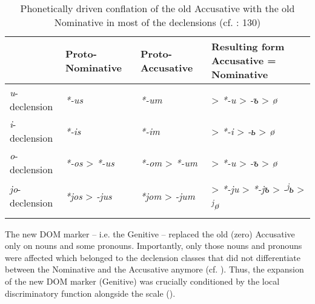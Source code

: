 \documentclass[output=paper]{langsci/langscibook}
\begin{document}
\begin{table}
\begin{tabularx}{\textwidth}{lp{2.3cm}p{2.3cm}Q}
\lsptoprule
\bfseries ~ & \bfseries Proto- Nominative & \bfseries Proto- Accusative & {\bfseries Resulting form}
\bfseries Accusative = Nominative\\
\midrule
\textit{u}{}-declension & \textit{*-us} & \textit{*-um} & > \textit{*-u} > \textit{-{ъ}} > \textit{ø}\\
\textit{i}{}-declension & \textit{*-is} & \textit{*-im} & > \textit{*-i} > \textit{-{ь}} > \textit{ø}\\
\textit{o}{}-declension & \textit{*-os} > \textit{*-us} & \textit{*-om} > \textit{*-um} & > \textit{*-u} > \textit{-{ъ}} > \textit{ø}\\
\textit{jo}{}-declension & \textit{*jos} > \textit{-jus} & \textit{*jom} > \textit{-jum} & > \textit{*-ju} > \textit{*}\textit{{}-j}\textit{{ъ} }> \textit{-\textsuperscript{j}}\textit{{ь}} > \textit{\textsuperscript{j}}\textit{ø}\\
\lspbottomrule
\end{tabularx}

\caption{Phonetically driven conflation of the old Accusative with the old Nominative in most of the declensions (cf. \citealt{Arumaa1985}: 130)}
\label{tab:serzant:1}
\end{table}

The new DOM marker – i.e. the Genitive  – replaced the old (zero) Accusative only on  nouns and some pronouns. Importantly, only those  nouns and pronouns were affected which belonged to the declension classes that did not differentiate between the Nominative and the Accusative anymore (cf. ). Thus, the expansion of the new DOM marker (Genitive) was crucially conditioned by the local discriminatory function alongside the  scale (\citealt{Krysko1994_Russ}). 
\end{document}
